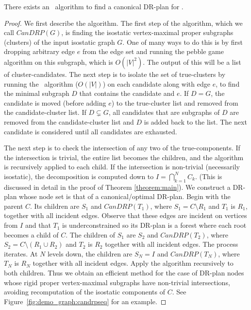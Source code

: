 \begin{theorem}\label{theorem:algo_complexity}
    There exists an \candrpcomplexityv\ algorithm to find a canonical DR-plan for .
\end{theorem}

\begin{proof}
We first describe the algorithm.
The first step of the algorithm, which we call $CanDRP(G)$, is finding the isostatic vertex-maximal proper subgraphs (clusters) of the input isostatic graph $G$. One of many ways to do this is  by first dropping arbitrary edge $e$ from the edge set and running the pebble game algorithm \cite{Jacobs:1997:PG} on this subgraph, which is $O(|V|^2)$. The output of this will be a list of cluster-candidates. The next step is to isolate the set of true-clusters by running the \frontier\ algorithm \cite{hoffman2001decompositionII} \cite{lomonosov2004graph} ($O(|V|)$) on each candidate along with edge $e$, to find the minimal subgraph $D$ that contains the candidate and $e$. If $D=G$, the candidate is moved (before adding $e$) to the true-cluster list and removed from the candidate-cluster list. If $D\subsetneq G$, all candidates that are subgraphs of $D$ are removed from the candidate-cluster list and $D$ is added back to the list.  The next candidate is considered until all candidates are exhausted.

The next step is to check the intersection of any two of the true-components. If the intersection is trivial, the entire list becomes the children, and the algorithm is recursively applied to each child. If the intersection is non-trivial (necessarily isostatic), the  decomposition is computed down to $I=\bigcap_{k=1}^{N}{C_k}$. (This is discussed in detail in the proof of Theorem \ref{theorem:main}). We construct a DR-plan whose node set is that of a canonical/optimal DR-plan. Begin with the parent $C$. Its children are $S_1$ and $CanDRP(T_1)$, where $S_1=C\setminus R_1$ and $T_1$ is $R_1$, together with all incident edges. Observe that these edges are incident on vertices from $I$ and that $T_1$ is underconstrained so its DR-plan is a forest where each root becomes a child of $C$. The children of $S_1$ are $S_2$ and $CanDRP(T_2)$, where $S_2=C\setminus (R_1\cup R_2)$ and $T_2$ is $R_2$ together with all incident edges. The process iterates. At $N$ levels down, the children are  $S_N=I$ and $CanDRP(T_N)$, where $T_N$ is $R_N$ together with all incident edges. Apply the algorithm recursively to both children.
Thus we obtain an efficient method for the case of DR-plan nodes whose rigid proper vertex-maximal subgraphs have non-trivial intersections, avoiding recomputation of the isostatic components of $C$.
See Figure~\ref{fig:demo_graph:candrpseq} for an example.


\end{proof}
